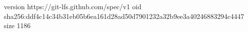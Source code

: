 version https://git-lfs.github.com/spec/v1
oid sha256:ddf4c14c34b31eb05b6ea161d28ad50d7901232a32b9ee3a40246883294c4447
size 1186
